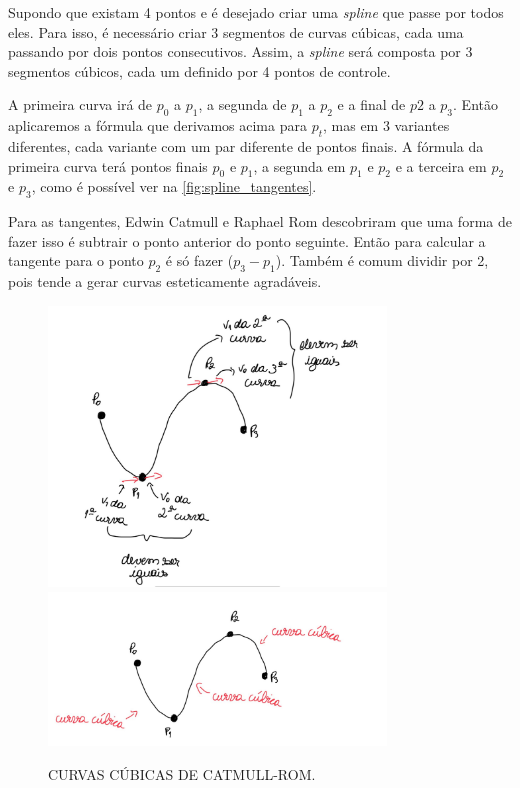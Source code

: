  Supondo que existam 4 pontos e é desejado criar uma \textit{spline} que passe por todos eles. Para isso, é necessário criar 3 segmentos de curvas cúbicas, cada uma passando por dois pontos consecutivos. Assim, a \textit{spline} será composta por 3 segmentos cúbicos, cada um definido por 4 pontos de controle. \cite{CatmullRom}

 A primeira curva irá de $p_0$ a $p_1$, a segunda de $p_1$ a $p_2$ e a final de $p2$ a $p_3$. Então aplicaremos a fórmula que derivamos acima para $p_t$, mas em 3 variantes diferentes, cada variante com um par diferente de pontos finais. A fórmula da primeira curva terá pontos finais $p_0$ e $p_1$, a segunda em $p_1$ e $p_2$ e a terceira em $p_2$ e $p_3$, como é possível ver na \autoref{fig:spline_tangentes}. 
 
 Para as tangentes, Edwin Catmull e Raphael Rom descobriram que uma forma de fazer isso é subtrair o ponto anterior do ponto seguinte. Então para calcular a tangente para o ponto $p_2$ é só fazer ($p_3 - p_1$). Também é comum dividir por 2, pois tende a gerar curvas esteticamente agradáveis.

\begin{figure}[h!]
    \caption{CURVAS CÚBICAS DE CATMULL-ROM.}
    \centering
    \includegraphics[width=0.8\textwidth]{fig/s1.jpg}
    \vspace{0.5em} %
    \includegraphics[width=0.8\textwidth]{fig/s2.jpg}
    \label{fig:spline_tangentes}
\end{figure}

